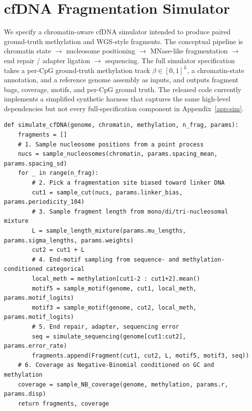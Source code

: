 \section{cfDNA Fragmentation Simulator}
\label{sec:simulator}

We specify a chromatin-aware cfDNA simulator intended to produce paired ground-truth methylation and WGS-style fragments. The conceptual pipeline is chromatin state $\to$ nucleosome positioning $\to$ MNase-like fragmentation $\to$ end repair / adapter ligation $\to$ sequencing. The full simulator specification takes a per-CpG ground-truth methylation track $\beta\in[0,1]^L$, a chromatin-state annotation, and a reference genome assembly as inputs, and outputs fragment bags, coverage, motifs, and per-CpG ground truth. The released code currently implements a simplified synthetic harness that captures the same high-level dependencies but not every full-specification component in Appendix~\ref{app:sim}.

\begin{lstlisting}[style=py,caption={cfDNA fragmentation simulator (algorithmic skeleton). Full specification in Appendix~\ref{app:sim}; released code implements a simplified harness for the current synthetic experiments.}]
def simulate_cfDNA(genome, chromatin, methylation, n_frag, params):
    fragments = []
    # 1. Sample nucleosome positions from a point process
    nucs = sample_nucleosomes(chromatin, params.spacing_mean, params.spacing_sd)
    for _ in range(n_frag):
        # 2. Pick a fragmentation site biased toward linker DNA
        cut1 = sample_cut(nucs, params.linker_bias, params.periodicity_104)
        # 3. Sample fragment length from mono/di/tri-nucleosomal mixture
        L = sample_length_mixture(params.mu_lengths, params.sigma_lengths, params.weights)
        cut2 = cut1 + L
        # 4. End-motif sampling from sequence- and methylation-conditioned categorical
        local_meth = methylation[cut1-2 : cut1+2].mean()
        motif5 = sample_motif(genome, cut1, local_meth, params.motif_logits)
        motif3 = sample_motif(genome, cut2, local_meth, params.motif_logits)
        # 5. End repair, adapter, sequencing error
        seq = simulate_sequencing(genome[cut1:cut2], params.error_rate)
        fragments.append(Fragment(cut1, cut2, L, motif5, motif3, seq))
    # 6. Coverage as Negative-Binomial conditioned on GC and methylation
    coverage = sample_NB_coverage(genome, methylation, params.r, params.disp)
    return fragments, coverage
\end{lstlisting}

